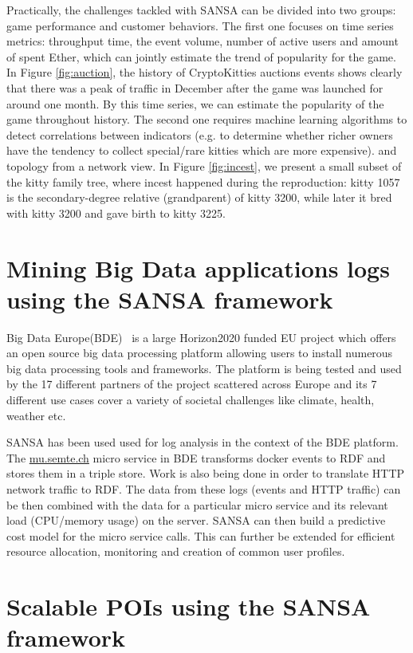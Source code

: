Practically, the challenges tackled with SANSA can be divided into two groups: game performance and customer behaviors. The first one focuses on time series metrics: throughput time, the event volume, number of active users and amount of spent Ether, which can jointly estimate the trend of popularity for the game. In Figure \ref{fig:auction}, the history of CryptoKitties auctions events shows clearly that there was a peak of traffic in December after the game was launched for around one month. By this time series, we can estimate the popularity of the game throughout history.
The second one requires machine learning algorithms to detect correlations between indicators (e.g. to determine whether richer owners have the tendency to collect special/rare kitties which are more expensive). and topology from a network view. In Figure \ref{fig:incest}, we present a small subset of the kitty family tree, where incest happened during the reproduction: kitty 1057 is the secondary-degree relative (grandparent) of kitty 3200, while later it bred with kitty 3200 and gave birth to kitty 3225.


\section{Mining Big Data applications logs using the SANSA framework}
\label{sec:bde-use-case}
Big Data Europe(BDE)~\cite{Auer+ICWE-2017} is a large Horizon2020 funded EU project which offers an open source big data processing platform allowing users to install numerous big data processing tools and frameworks. 
The platform is being tested and used by the 17 different partners of the project scattered across Europe and its 7 different use cases cover a variety of societal challenges like climate, health, weather etc.

SANSA has been used used for log analysis in the context of the BDE platform.
The \url{mu.semte.ch} micro service in BDE transforms docker events to RDF and stores them in a triple store.
Work is also being done in order to translate HTTP network traffic to RDF. 
The data from these logs (events and HTTP traffic) can be then combined with the data for a particular micro service and its relevant load (CPU/memory usage) on the server. SANSA can then build a predictive cost model for the micro service calls. This can further be extended for efficient resource allocation, monitoring and creation of common user profiles.

\section{Scalable POIs using the SANSA framework}
\label{sec:slipo-use-case}

